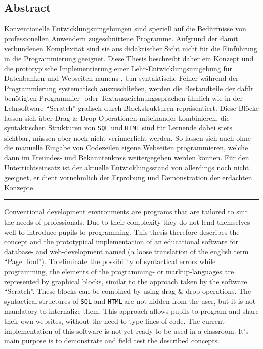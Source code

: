 \begin{titlepage}

\section*{Abstract}

Konventionelle Entwicklungsumgebungen sind speziell auf die Bedürfnisse von professionellen Anwendern zugeschnittene Programme. Aufgrund der damit verbundenen Komplexität sind sie aus didaktischer Sicht nicht für die Einführung in die Programmierung geeignet. Diese Thesis beschreibt daher ein Konzept und die prototypische Implementierung einer Lehr-Entwicklungsumgebung für Datenbanken und Webseiten namens \idename{}. Um syntaktische Fehler während der Programmierung systematisch auszuschließen, werden die Bestandteile der dafür benötigten Programmier- oder Textauszeichnungssprachen ähnlich wie in der Lehrsoftware "`Scratch"' grafisch durch Blockstrukturen repräsentiert. Diese Blöcke lassen sich über Drag \& Drop-Operationen miteinander kombinieren, die syntaktischen Strukturen von \texttt{SQL} und \texttt{HTML} sind für Lernende dabei stets sichtbar, müssen aber noch nicht verinnerlicht werden. So lassen sich auch ohne die manuelle Eingabe von Codezeilen eigene Webseiten programmieren, welche dann im Freundes- und Bekanntenkreis weitergegeben werden können. Für den Unterrichtseinsatz ist der aktuelle Entwicklungsstand von \idename{} allerdings noch nicht geeignet, er dient vornehmlich der Erprobung und Demonstration der erdachten Konzepte.

\rule{\textwidth}{1pt}

Conventional development environments are programs that are tailored to suit the needs of professionals. Due to their complexity they do not lend themselves well to introduce pupils to programming. This thesis therefore describes the concept and the prototypical implementation of an educational software for database- and web-development named \idename{} (a loose translation of the english term ``Page Tool''). To eliminate the possibility of syntactical errors while programming, the elements of the programming- or markup-languages are represented by graphical blocks, similar to the approach taken by the software ``Scratch''. These blocks can be combined by using drag \& drop operations. The syntactical structures of \texttt{SQL} and \texttt{HTML} are not hidden from the user, but it is not mandatory to internalize them. This approach allows pupils to program and share their own websites, without the need to type lines of code. The current implementation of this software is not yet ready to be used in a classroom. It's main purpose is to demonstrate and field test the described concepts.

\end{titlepage}

